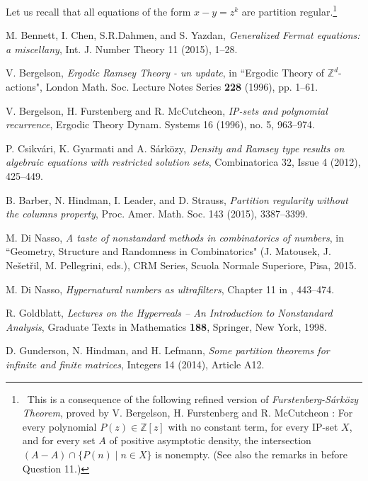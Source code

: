 \documentclass[11pt]{amsart}
\theoremstyle{definition}
\theoremstyle{remark}
\numberwithin{equation}{section}
\begin{document}
\smallskip
Let us recall that all equations of the form
$x-y=z^k$ are partition regular.\footnote
{~This is a consequence of the following refined version
of \emph{Furstenberg-S\'ark\"ozy Theorem},
proved by V. Bergelson, H. Furstenberg and R. McCutcheon \cite{BFMC96}:
For every polynomial $P(z)\in{\mathbb{Z}}[z]$ with no constant term,
for every IP-set $X$, and for every set $A$ of positive
asymptotic density, the intersection
$(A-A)\cap\{P(n)\mid n\in X\}$ is nonempty.
(See also the remarks in \cite{B96} before Question 11.)}

\bigskip
\begin{thebibliography}{99}

M. Bennett, I. Chen, S.R.Dahmen, and S. Yazdan,
\emph{Generalized Fermat equations: a miscellany},
 Int. J. Number Theory 11 (2015), 1--28.

V. Bergelson,
\emph{Ergodic Ramsey Theory - un update}, in
``Ergodic Theory of ${\mathbb{Z}}^d$-actions", London Math. Soc. Lecture
Notes Series \textbf{228} (1996), pp. 1--61.

V. Bergelson, H. Furstenberg and R. McCutcheon, 
\emph{IP-sets and polynomial recurrence}, 
Ergodic Theory Dynam. Systems 16 (1996), no. 5, 963--974.

P. Csikv\'ari, K. Gyarmati and A. S\'ark\"{o}zy, 
\emph{Density and Ramsey type results on algebraic
equations with restricted solution sets}, Combinatorica 32, 
Issue 4 (2012), 425--449.

B. Barber, N. Hindman, I. Leader, and D. Strauss,
\emph{Partition regularity without the columns property}, 
Proc. Amer. Math. Soc. 143 (2015), 3387--3399.

M. Di Nasso, 
\emph{A taste of nonstandard methods in combinatorics of numbers}, in 
``Geometry, Structure and Randomness in Combinatorics"
(J. Matousek, J. Ne\v{s}et\v{r}il, M. Pellegrini, eds.), 
CRM Series, Scuola Normale Superiore, Pisa, 2015.

M. Di Nasso, \emph{Hypernatural numbers as 
ultrafilters}, Chapter 11 in \cite{LW15}, 443--474.

R. Goldblatt,
\emph{Lectures on the Hyperreals -- An Introduction
to Nonstandard Analysis}, Graduate Texts in Mathematics
\textbf{188}, Springer, New York, 1998.

D. Gunderson, N. Hindman, and H. Lefmann,
\emph{Some partition theorems for infinite and finite matrices}, 
Integers 14 (2014), Article A12.


\end{thebibliography}
\end{document}
